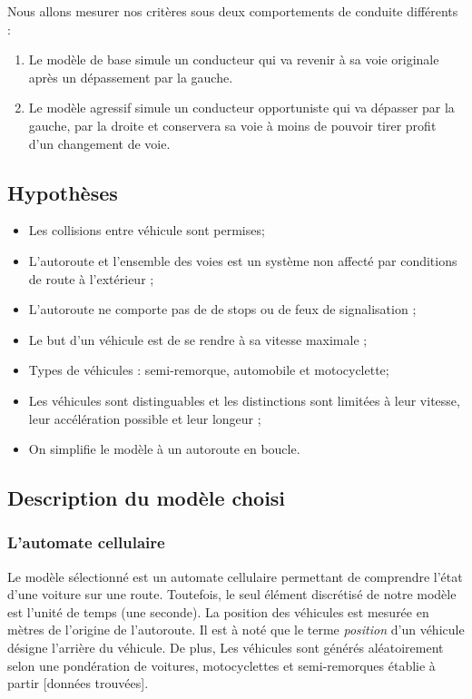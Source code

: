 \documentclass[12pt,letterpaper]{article}
\begin{document}
\vspace{0.4cm}
Nous allons mesurer nos critères sous deux comportements de conduite différents : 
\begin{enumerate}
	\item Le modèle de base simule un conducteur qui va revenir à sa voie originale après un dépassement par la gauche.
	\item Le modèle agressif simule un conducteur opportuniste qui va dépasser par la gauche, par la droite et conservera sa voie à moins de pouvoir tirer profit d’un changement de voie.
\end{enumerate}

\subsection{Hypothèses}
\renewcommand{\labelitemi}{\textendash}
\renewcommand{\labelitemii}{-}
\begin{itemize}
	\item Les collisions entre véhicule sont permises;
	\item L'autoroute et l'ensemble des voies est un système non affecté par conditions de route à l'extérieur ;
	\item L'autoroute ne comporte pas de de stops ou de feux de signalisation ;
	\item Le but d'un véhicule est de se rendre à sa vitesse maximale ; 
	\item Types de véhicules : semi-remorque, automobile et motocyclette;
	\item Les véhicules sont distinguables et les distinctions sont limitées à leur vitesse, leur accélération possible et leur longeur ;
	\item On simplifie le modèle à un autoroute en boucle.

\end{itemize}

\subsection{Description du modèle choisi}

\subsubsection{L'automate cellulaire}
Le modèle sélectionné est un automate cellulaire permettant de comprendre l'état d’une voiture sur une route. Toutefois, le seul élément discrétisé de notre modèle est l'unité de temps (une seconde). La position des véhicules est mesurée en mètres de l'origine de l'autoroute. Il est à noté que le terme \textit{position} d'un véhicule désigne l'arrière du véhicule. De plus, Les véhicules sont générés aléatoirement selon une pondération de voitures, motocyclettes et semi-remorques établie à partir [données trouvées]. 
\end{document}
